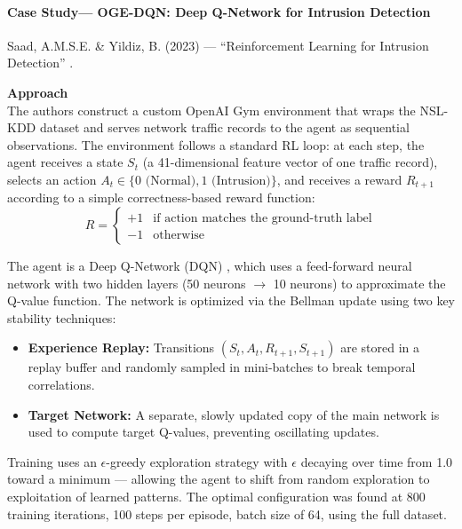 \paragraph{Case Study--- OGE-DQN: Deep Q-Network for Intrusion Detection}
Saad, A.M.S.E. \& Yildiz, B. (2023) --- ``Reinforcement Learning for Intrusion Detection'' \cite{saad2023reinforcement}.

\textbf{Approach} \\
The authors construct a custom OpenAI Gym environment that wraps the NSL-KDD dataset and serves network traffic records to the agent as sequential observations. The environment follows a standard RL loop: at each step, the agent receives a state $S_t$ (a 41-dimensional feature vector of one traffic record), selects an action $A_t \in \{0 \text{ (Normal)}, 1 \text{ (Intrusion)}\}$, and receives a reward $R_{t+1}$ according to a simple correctness-based reward function:
\[
R = \begin{cases} 
+1 & \text{if action matches the ground-truth label} \\ 
-1 & \text{otherwise} 
\end{cases}
\]

The agent is a Deep Q-Network (DQN) \cite{mnih2015human}, which uses a feed-forward neural network with two hidden layers (50 neurons $\rightarrow$ 10 neurons) to approximate the Q-value function. The network is optimized via the Bellman update using two key stability techniques:
\begin{itemize}
    \item \textbf{Experience Replay:} Transitions $(S_t, A_t, R_{t+1}, S_{t+1})$ are stored in a replay buffer and randomly sampled in mini-batches to break temporal correlations.
    \item \textbf{Target Network:} A separate, slowly updated copy of the main network is used to compute target Q-values, preventing oscillating updates.
\end{itemize}

Training uses an $\epsilon$-greedy exploration strategy with $\epsilon$ decaying over time from 1.0 toward a minimum --- allowing the agent to shift from random exploration to exploitation of learned patterns. The optimal configuration was found at 800 training iterations, 100 steps per episode, batch size of 64, using the full dataset.

